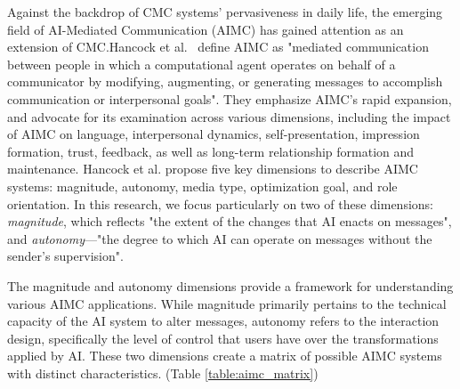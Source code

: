 Against the backdrop of CMC systems' pervasiveness in daily life, the emerging field of AI-Mediated Communication (AIMC) has gained attention as an extension of CMC.Hancock et al.~\cite{Hancock2020} define AIMC as "mediated communication between people in which a computational agent operates on behalf of a communicator by modifying, augmenting, or generating messages to accomplish communication or interpersonal goals". They emphasize AIMC's rapid expansion, and advocate for its examination across various dimensions, including the impact of AIMC on language, interpersonal dynamics, self-presentation, impression formation, trust, feedback, as well as long-term relationship formation and maintenance. Hancock et al. propose five key dimensions to describe AIMC systems: magnitude, autonomy, media type, optimization goal, and role orientation. In this research, we focus particularly on two of these dimensions: \textit{magnitude}, which reflects "the extent of the changes that AI enacts on messages", and \textit{autonomy}—"the degree to which AI can operate on messages without the sender's supervision".

The magnitude and autonomy dimensions provide a framework for understanding various AIMC applications. While magnitude primarily pertains to the technical capacity of the AI system to alter messages, autonomy refers to the interaction design, specifically the level of control that users have over the transformations applied by AI. These two dimensions create a matrix of possible AIMC systems with distinct characteristics. (Table \ref{table:aimc_matrix})

